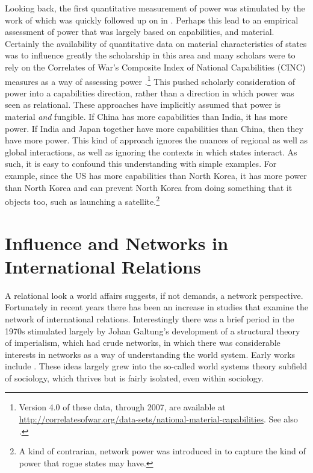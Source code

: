 \documentclass[12pt,oneside,doublespace,pdflatex]{amsart}
\begin{document}
Looking back, the first quantitative measurement of power was stimulated by the work of \cite{fucks:1965} which was quickly followed up on in \cite{morgenstern:1974}.  Perhaps this lead to an empirical assessment of power that was largely based on capabilities, and material.  Certainly the availability of quantitative data on material characteristics of states was to influence
greatly the scholarship in this area and many scholars were to rely on the Correlates of War's Composite Index of National Capabilities (CINC) measures as a way of assessing power \citep{singer:etal:1972}.\footnote{Version 4.0 of these data, 
through 2007, are available at \url{http://correlatesofwar.org/data-sets/national-material-capabilities}. See also \citet{park:ward:1988}.}  This pushed scholarly consideration of power into a capabilities direction, rather than a direction in which power was seen as relational.  These approaches have implicitly assumed that power is material 
{\em and} fungible. If China has more capabilities than India, it has more power. If India and Japan together have more capabilities than China, then they have more power. This kind of approach ignores the nuances of regional as well as global interactions, as well as ignoring the contexts in which states interact.  As such, it is easy to confound this understanding with simple examples. For example, since the US has more capabilities than North Korea, it has more power than North Korea and can prevent North Korea from doing something that it objects too, such as launching a satellite.\footnote{A kind of contrarian, network power was introduced in \cite{ward:house:1988,house:ward:1988} to capture the kind of power that rogue states may have.}

\section{Influence and Networks in International Relations}

A relational look a world affairs suggests, if not demands, a network perspective.  Fortunately in recent years there has been an increase in studies that examine the network of international relations.
Interestingly there was a brief period in the 1970s stimulated largely by
Johan Galtung's development of a structural theory of imperialism, which had crude networks, 
\citeyear{galtung:1971} in which there was considerable interests in networks as a way of understanding
the world system.  Early works include 
\cite{skjelsbaek:1972,chasedunn:rubinson:1977,bornschier:metal:1979,chirot:hall:1982}. These ideas largely grew into the
so-called world systems theory subfield of sociology, which thrives but is fairly isolated, even within sociology.
\end{document}

